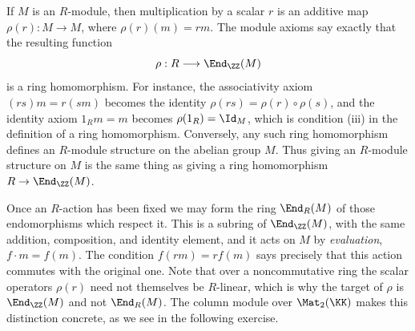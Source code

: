 \documentclass[12pt,reqno]{amsart}
\begin{document}
If $M$ is an $R$-module, then multiplication by a scalar $r$ is an additive map $\rho(r):M\to M$, where $\rho(r)(m)=rm$. The module axioms say exactly that the resulting function
\[
 \rho:R\longrightarrow\End_{\ZZ}(M)
\]
is a ring homomorphism. For instance, the associativity axiom $(rs)m=r(sm)$ becomes the identity $\rho(rs)=\rho(r)\circ\rho(s)$, and the identity axiom $1_Rm=m$ becomes $\rho(1_R)=\Id_M$, which is condition (iii) in the definition of a ring homomorphism. Conversely, any such ring homomorphism defines an $R$-module structure on the abelian group $M$. Thus giving an $R$-module structure on $M$ is the same thing as giving a ring homomorphism $R\to\End_{\ZZ}(M)$.

Once an $R$-action has been fixed we may form the ring $\End_R(M)$ of those endomorphisms which respect it. This is a subring of $\End_{\ZZ}(M)$, with the same addition, composition, and identity element, and it acts on $M$ by \emph{evaluation}, $f\cdot m=f(m)$. The condition $f(rm)=rf(m)$ says precisely that this action commutes with the original one. Note that over a noncommutative ring the scalar operators $\rho(r)$ need not themselves be $R$-linear, which is why the target of $\rho$ is $\End_{\ZZ}(M)$ and not $\End_R(M)$. The column module over $\Mat_2(\KK)$ makes this distinction concrete, as we see in the following exercise.

\hrulefill
\end{document}
